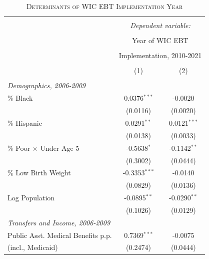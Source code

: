 \begin{table}[!htbp]
	\begin{center}
		\caption{\textsc{Determinants of WIC EBT Implementation Year}} 
		\label{ebt_det} 
		\footnotesize 
		\begin{tabular}{@{\extracolsep{0pt}}lcc } 
			\\[-1.8ex]\hline 
			\hline \\[-1.8ex] 
			& \multicolumn{2}{c}{\textit{Dependent variable:}} \\ 
			\cline{2-3} 
			\\[-1.8ex] & \multicolumn{2}{c}{Year of WIC EBT} \\
			\\[-1.8ex] & \multicolumn{2}{c}{Implementation, 2010-2021} \\
			\\[-1.8ex] & \multicolumn{1}{c}{(1)} & \multicolumn{1}{c}{(2)}\\ 
			\hline \\[-1.8ex] 
			\multicolumn{3}{l}{\textit{Demographics, 2006-2009}} \\ 
			[1.2ex]
			\hspace{12pt} \% Black & 0.0376$^{***}$ & -0.0020 \\ 
			 & (0.0116)   & (0.0020)\\   
			[1.2ex]
			\hspace{12pt} \% Hispanic &  0.0291$^{**}$ & 0.0121$^{***}$ \\ 
			& (0.0138)        & (0.0033)\\  
			[1.2ex]
			\hspace{12pt} \% Poor $\times$ Under Age 5 & -0.5638$^{*}$ & -0.1142$^{**}$ \\ 
			& (0.3002)        & (0.0444)\\ 
			[1.2ex]
			\hspace{12pt} \% Low Birth Weight & -0.3353$^{***}$ & -0.0140 \\ 
			& (0.0829)        & (0.0136)\\ 
			[1.2ex]
			\hspace{12pt} Log Population & -0.0895$^{**}$ & -0.0290$^{**}$ \\ 
			& (0.1026)        & (0.0129)\\
			[1.2ex]
			\multicolumn{3}{l}{\textit{Transfers and Income, 2006-2009}} \\ 
			[1.2ex]
			\hspace{12pt} Public Asst. Medical Benefits p.p. & 0.7369$^{***}$ & -0.0075 \\
			\hspace{24pt} (incl., Medicaid)  & (0.2474)        & (0.0444)\\  

\end{tabular}
\end{center}
\end{table}

